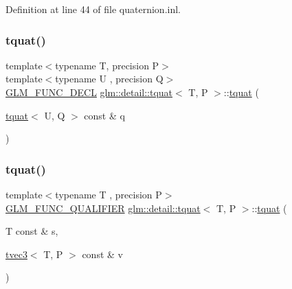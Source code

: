 Definition at line 44 of file quaternion.\+inl.

\mbox{\label{structglm_1_1detail_1_1tquat_aa6b415284ed415db4ac328f3c0fd42d7}} 
\subsubsection{\texorpdfstring{tquat()}{tquat()}\hspace{0.1cm}{\footnotesize\ttfamily [2/9]}}
{\footnotesize\ttfamily template$<$typename T, precision P$>$ \\
template$<$typename U , precision Q$>$ \\
\hyperlink{setup_8hpp_ab2d052de21a70539923e9bcbf6e83a51}{G\+L\+M\+\_\+\+F\+U\+N\+C\+\_\+\+D\+E\+CL} \hyperlink{structglm_1_1detail_1_1tquat}{glm\+::detail\+::tquat}$<$ T, P $>$\+::\hyperlink{structglm_1_1detail_1_1tquat}{tquat} (\begin{DoxyParamCaption}\item[{\hyperlink{structglm_1_1detail_1_1tquat}{tquat}$<$ U, Q $>$ const \&}]{q }\end{DoxyParamCaption})\hspace{0.3cm}{\ttfamily [explicit]}}

\mbox{\label{structglm_1_1detail_1_1tquat_aba298cc62aaee76c3d19294f33454187}} 
\subsubsection{\texorpdfstring{tquat()}{tquat()}\hspace{0.1cm}{\footnotesize\ttfamily [3/9]}}
{\footnotesize\ttfamily template$<$typename T , precision P$>$ \\
\hyperlink{setup_8hpp_a33fdea6f91c5f834105f7415e2a64407}{G\+L\+M\+\_\+\+F\+U\+N\+C\+\_\+\+Q\+U\+A\+L\+I\+F\+I\+ER} \hyperlink{structglm_1_1detail_1_1tquat}{glm\+::detail\+::tquat}$<$ T, P $>$\+::\hyperlink{structglm_1_1detail_1_1tquat}{tquat} (\begin{DoxyParamCaption}\item[{T const \&}]{s,  }\item[{\hyperlink{structglm_1_1detail_1_1tvec3}{tvec3}$<$ T, P $>$ const \&}]{v }\end{DoxyParamCaption})}



